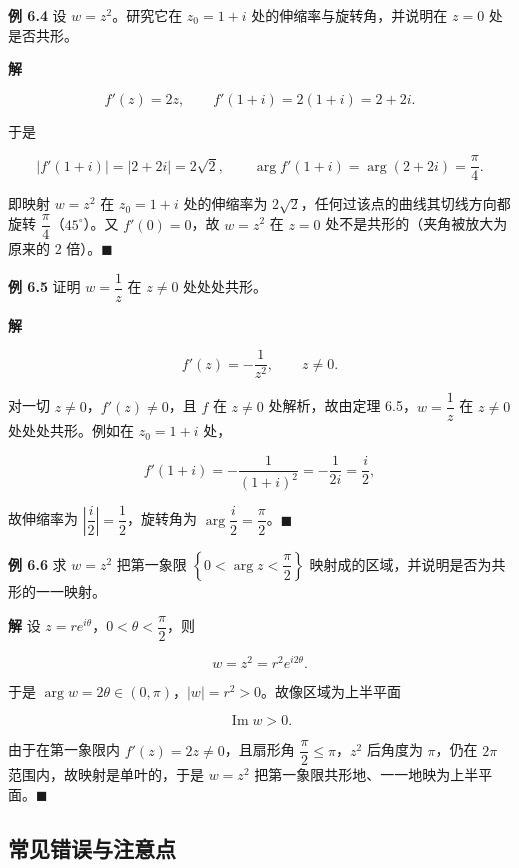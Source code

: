 \textbf{例 6.4} 设 \(w=z^2\)。研究它在 \(z_0=1+i\)
处的伸缩率与旋转角，并说明在 \(z=0\) 处是否共形。

\textbf{解}

\[
f'(z)=2z,\qquad f'(1+i)=2(1+i)=2+2i .
\]

于是

\[
|f'(1+i)|=|2+2i|=2\sqrt2,\qquad
\arg f'(1+i)=\arg(2+2i)=\frac{\pi}{4}.
\]

即映射 \(w=z^2\) 在 \(z_0=1+i\) 处的伸缩率为
\(2\sqrt2\)，任何过该点的曲线其切线方向都旋转
\(\dfrac{\pi}{4}\)（\(45^\circ\)）。又 \(f'(0)=0\)，故 \(w=z^2\) 在
\(z=0\) 处不是共形的（夹角被放大为原来的 \(2\) 倍）。\(\blacksquare\)

\textbf{例 6.5} 证明 \(w=\dfrac{1}{z}\) 在 \(z\neq 0\) 处处处共形。

\textbf{解}

\[
f'(z)=-\frac{1}{z^{2}},\qquad z\neq 0 .
\]

对一切 \(z\neq 0\)，\(f'(z)\neq 0\)，且 \(f\) 在 \(z\neq 0\)
处解析，故由定理 6.5，\(w=\dfrac{1}{z}\) 在 \(z\neq 0\)
处处处共形。例如在 \(z_0=1+i\) 处，

\[
f'(1+i)=-\frac{1}{(1+i)^{2}}=-\frac{1}{2i}=\frac{i}{2},
\]

故伸缩率为 \(\left|\dfrac{i}{2}\right|=\dfrac12\)，旋转角为
\(\arg\dfrac{i}{2}=\dfrac{\pi}{2}\)。\(\blacksquare\)

\textbf{例 6.6} 求 \(w=z^2\) 把第一象限
\(\left\{0<\arg z<\dfrac{\pi}{2}\right\}\)
映射成的区域，并说明是否为共形的一一映射。

\textbf{解} 设 \(z=re^{i\theta}\)，\(0<\theta<\dfrac{\pi}{2}\)，则

\[
w=z^{2}=r^{2}e^{i2\theta}.
\]

于是 \(\arg w=2\theta\in(0,\pi)\)，\(|w|=r^{2}>0\)。故像区域为上半平面

\[
\operatorname{Im}w>0 .
\]

由于在第一象限内 \(f'(z)=2z\neq 0\)，且扇形角
\(\dfrac{\pi}{2}\le \pi\)，\(z^2\) 后角度为 \(\pi\)，仍在 \(2\pi\)
范围内，故映射是单叶的，于是 \(w=z^2\)
把第一象限共形地、一一地映为上半平面。\(\blacksquare\)

\subsection{常见错误与注意点}\label{ux5e38ux89c1ux9519ux8befux4e0eux6ce8ux610fux70b9-19}

